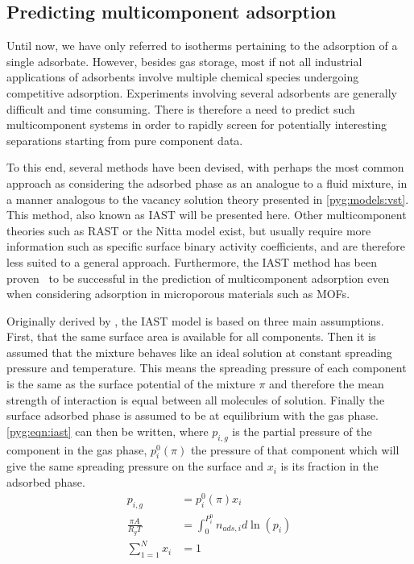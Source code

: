 
\subsection{Predicting multicomponent adsorption}\label{pyg:iast}

Until now, we have only referred to isotherms pertaining to the adsorption
of a single adsorbate. However, besides gas storage, most if not all
industrial applications of adsorbents involve multiple chemical
species undergoing competitive adsorption. Experiments involving
several adsorbents are generally difficult and time consuming.
There is therefore a need to predict such multicomponent systems
in order to rapidly screen for potentially interesting separations
starting from pure component data.

To this end, several methods have been devised, with perhaps
the most common approach as considering the adsorbed phase as
an analogue to a fluid mixture, in a manner analogous to the
vacancy solution theory presented in \autoref{pyg:models:vst}.
This method, also known as \gls{IAST}
will be presented here. Other multicomponent theories
such as \gls{RAST} or the Nitta model
exist, but usually require more information such as specific
surface binary activity coefficients, and are therefore less suited to
a general approach. Furthermore, the \gls{IAST} method has been
proven~\cite{cessfordEvaluationIdealAdsorbed2012,%
	vanheestIdentificationMetalOrganic2012} to be successful in the
prediction of multicomponent adsorption even when considering
adsorption in microporous materials such as \glspl{MOF}.

Originally derived by \citet{myersThermodynamicsMixedgasAdsorption1965},
the \gls{IAST} model is based on three main assumptions. First, that the
same surface area is available for all components. Then it is
assumed that the mixture behaves like an ideal solution at constant
spreading pressure and temperature. This means the spreading pressure of
each component is the same as the surface potential of the mixture \(\pi\)
and therefore the mean strength of interaction is equal between all
molecules of solution. Finally the surface adsorbed phase is assumed
to be at equilibrium with the gas phase. \autoref{pyg:eqn:iast}
can then be written, where \(p_{i,g}\) is the partial pressure of
the component in the gas phase, \( p_i^0(\pi)\) the pressure of
that component which will give the same spreading pressure on the
surface and \(x_i\) is its fraction in the adsorbed phase.
%
\begin{align}
	p_{i,g}             & = p_i^0(\pi)x_i                              %
	\label{pyg:eqn:iast}                                               \\
	\frac{\pi A}{R_g T} & = \int_{0}^{P_{i}^{0}} n_{ads,i} d\ln{(p_i)} %
	\label{pyg:eqn:iast-2}                                             \\
	\sum_{1=1}^{N} x_i  & = 1                                          %
	\label{pyg:eqn:iast-3}
\end{align}

